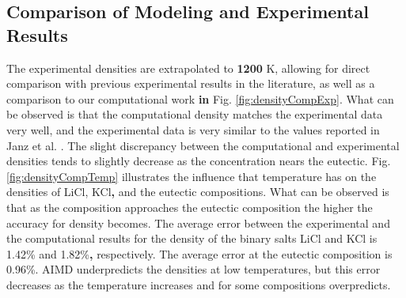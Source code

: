 \documentclass[review]{elsarticle}
\providecommand{\DIFaddtex}[1]{{\bf #1}} %
\providecommand{\DIFdeltex}[1]{} %
\providecommand{\DIFaddbegin}{\protect\color{blue}} %
\providecommand{\DIFaddend}{\protect\color{black}} %
\providecommand{\DIFdelbegin}{\protect\color{red}} %
\providecommand{\DIFdelend}{\protect\color{black}} %
\providecommand{\DIFadd}[1]{\texorpdfstring{\DIFaddtex{#1}}{#1}} %
\providecommand{\DIFdel}[1]{\texorpdfstring{\DIFdeltex{#1}}{}} %
\newcommand{\DIFscaledelfig}{0.5}
\newlength{\DIFdelgraphicswidth} %
\newlength{\DIFdelgraphicsheight} %
\newcommand{\DIFaddincludegraphics}[2][]{{\color{blue}\fbox{\DIFOincludegraphics[#1]{#2}}}} %
\newcommand{\DIFdelincludegraphics}[2][]{%
\sbox{\DIFdelgraphicsbox}{\DIFOincludegraphics[#1]{#2}}%
\settoboxwidth{\DIFdelgraphicswidth}{\DIFdelgraphicsbox} %
\settoboxtotalheight{\DIFdelgraphicsheight}{\DIFdelgraphicsbox} %
\scalebox{\DIFscaledelfig}{%
\parbox[b]{\DIFdelgraphicswidth}{\usebox{\DIFdelgraphicsbox}\\[-\baselineskip] \rule{\DIFdelgraphicswidth}{0em}}\llap{\resizebox{\DIFdelgraphicswidth}{\DIFdelgraphicsheight}{%
\setlength{\unitlength}{\DIFdelgraphicswidth}%
\begin{picture}(1,1)%
\thicklines\linethickness{2pt} %
{\color[rgb]{1,0,0}\put(0,0){\framebox(1,1){}}}%
{\color[rgb]{1,0,0}\put(0,0){\line( 1,1){1}}}%
{\color[rgb]{1,0,0}\put(0,1){\line(1,-1){1}}}%
\end{picture}%
}\hspace*{3pt}}} %
} %
\DeclareRobustCommand{\DIFaddbegin}{\DIFOaddbegin \let\includegraphics\DIFaddincludegraphics} %
\DeclareRobustCommand{\DIFaddend}{\DIFOaddend \let\includegraphics\DIFOincludegraphics} %
\DeclareRobustCommand{\DIFdelbegin}{\DIFOdelbegin \let\includegraphics\DIFdelincludegraphics} %
\DeclareRobustCommand{\DIFdelend}{\DIFOaddend \let\includegraphics\DIFOincludegraphics} %
\begin{document}
\FloatBarrier

\DIFaddend \subsection{Comparison of Modeling and Experimental Results}

The experimental densities are extrapolated to \DIFdelbegin \DIFdel{1100 }\DIFdelend \DIFaddbegin \DIFadd{1200 }\DIFaddend K, allowing for direct comparison with previous experimental results in the literature, as well as a comparison to our computational work \DIFdelbegin \DIFdel{(from }\DIFdelend \DIFaddbegin \DIFadd{in }\DIFaddend Fig. \ref{fig:densityCompExp}\DIFdelbegin \DIFdel{)}\DIFdelend . What can be observed is that the computational density matches the experimental data very well, and the experimental data is very similar to the values reported in Janz et al. \DIFdelbegin \DIFdel{\cite{Janz1974}}\DIFdelend \DIFaddbegin \DIFadd{\cite{janz1975molten,van1955electrical}}\DIFaddend . The slight discrepancy between the computational and experimental densities tends to slightly decrease as the concentration nears the eutectic. Fig. \ref{fig:densityCompTemp} illustrates the influence that temperature has on the densities of LiCl, KCl\DIFaddbegin \DIFadd{, }\DIFaddend and the eutectic compositions. What can be observed is that as the composition approaches the eutectic composition the higher the accuracy for density becomes. The average error between the experimental and the computational results for the density of the binary salts LiCl and KCl is 1.42\% and 1.82\%\DIFaddbegin \DIFadd{, }\DIFaddend respectively. The average error at the eutectic composition is 0.96\%. AIMD underpredicts the densities at low temperatures, but this error decreases as the temperature increases and for some compositions overpredicts.
\end{document}
